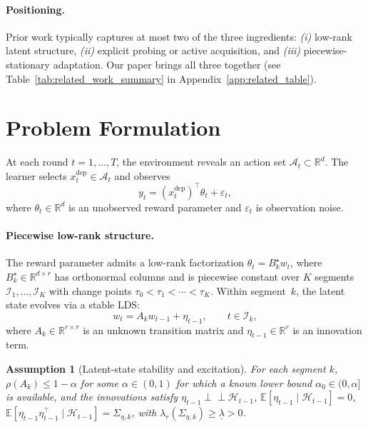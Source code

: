 \documentclass{article}
\newcommand{\R}{\mathbb{R}}
\newcommand{\E}{\mathbb{E}}
\newcommand{\cA}{\mathcal{A}}
\newcommand{\cH}{\mathcal{H}}
\newcommand{\cI}{\mathcal{I}}
\newtheorem{assumption}{Assumption}
\begin{document}
\paragraph{Positioning.}
Prior work typically captures at most two of the three ingredients: \emph{(i)} low-rank latent structure, \emph{(ii)} explicit probing or active acquisition, and \emph{(iii)} piecewise-stationary adaptation.
Our paper brings all three together (see Table~\ref{tab:related_work_summary} in Appendix~\ref{app:related_table}).

\section{Problem Formulation}
\label{sec:formulation}

At each round $t = 1, \ldots, T$, the environment reveals an action set $\cA_t \subset \R^d$.
The learner selects $x_t^{\mathrm{dep}} \in \cA_t$ and observes
\begin{equation}
  y_t = (x_t^{\mathrm{dep}})^\top \theta_t + \varepsilon_t,
  \label{eq:reward}
\end{equation}
where $\theta_t \in \R^d$ is an unobserved reward parameter and $\varepsilon_t$ is observation noise.

\paragraph{Piecewise low-rank structure.}
The reward parameter admits a low-rank factorization $\theta_t = B_k^\star w_t$, where $B_k^\star \in \R^{d \times r}$ has orthonormal columns and is piecewise constant over $K$ segments $\cI_1, \ldots, \cI_K$ with change points $\tau_0 < \tau_1 < \cdots < \tau_K$.
Within segment~$k$, the latent state evolves via a stable LDS:
\begin{equation}
  w_t = A_k w_{t-1} + \eta_{t-1}, \qquad t \in \cI_k,
  \label{eq:lds}
\end{equation}
where $A_k \in \R^{r \times r}$ is an unknown transition matrix and $\eta_{t-1} \in \R^r$ is an innovation term.

\begin{assumption}[Latent-state stability and excitation]
\label{assum:latent_dynamics}
For each segment $k$,
$\rho(A_k)\le 1-\alpha$ for some $\alpha\in(0,1)$ for which a known lower bound $\alpha_0\in(0,\alpha]$ is available,
and the innovations satisfy
$\eta_{t-1}\perp\!\!\!\perp \cH_{t-1}$,
$\E[\eta_{t-1}\mid \cH_{t-1}] = 0$,
$\E[\eta_{t-1}\eta_{t-1}^\top \mid \cH_{t-1}] = \Sigma_{\eta,k}$,
with $\lambda_r(\Sigma_{\eta,k}) \ge \underline{\lambda} > 0$.
\end{assumption}
\end{document}
